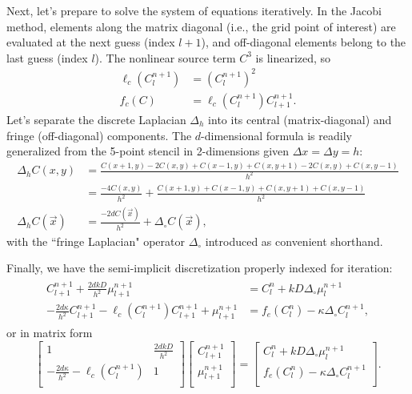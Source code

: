 	Next, let's prepare to solve the system of equations iteratively.
	In the Jacobi method, elements along the matrix diagonal (i.e., the grid point of interest) are evaluated at
	the next guess (index $l+1$), and off-diagonal elements belong to the last guess (index $l$).
	The nonlinear source term $C^3$ is linearized, so
	\begin{align*}
		\ell_c(C_l^{n+1}) &= \left(C_l^{n+1}\right)^2\\
		f_c(C) &= \ell_c(C_l^{n+1})C^{n+1}_{l+1}.
	\end{align*}
	Let's separate the discrete Laplacian $\Delta_h$ into its central (matrix-diagonal) and fringe (off-diagonal) components. The $d$-dimensional
	formula is readily generalized from the 5-point stencil in 2-dimensions given $\Delta x=\Delta y=h$:
	\begin{align*}
		\Delta_hC(x,y)	&= \frac{C(x+1,y)-2C(x,y)+C(x-1,y)+C(x,y+1)-2C(x,y)+C(x,y-1)}{h^2}\\
						&= \frac{-4C(x,y)}{h^2}+\frac{C(x+1,y)+C(x-1,y)+C(x,y+1)+C(x,y-1)}{h^2}\\
		\Delta_hC(\vec{x})	&= \frac{-2dC(\vec{x})}{h^2} + \Delta_\circ C(\vec{x}),
	\end{align*}
	with the ``fringe Laplacian" operator $\Delta_\circ$ introduced as convenient shorthand.

	Finally, we have the semi-implicit discretization properly indexed for iteration:
	\begin{align}
	\begin{split}
		C_{l+1}^{n+1} + \frac{2dkD}{h^2}\mu_{l+1}^{n+1} &= C_l^n + kD\Delta_\circ\mu_l^{n+1}\\
		-\frac{2d\kappa}{h^2}C_{l+1}^{n+1} - \ell_c(C_l^{n+1})C_{l+1}^{n+1} + \mu_{l+1}^{n+1} &= f_e(C_l^n) - \kappa\Delta_\circ C_l^{n+1},
	\end{split}
	\label{eqn:jacobieom}
	\end{align}
	or in matrix form
	\[
		\begin{bmatrix}
			1	&	\frac{2dkD}{h^2}\\[0.5em]
			-\frac{2d\kappa}{h^2} - \ell_c\left(C_l^{n+1}\right) & 1\\
		\end{bmatrix}
		\begin{bmatrix}
			C_{l+1}^{n+1} \\[0.5em]
			\mu_{l+1}^{n+1}\\
		\end{bmatrix}
		=
		\begin{bmatrix}
			C_l^n + kD\Delta_\circ\mu_l^{n+1}\\[0.5em]
			f_e(C_l^n) - \kappa\Delta_\circ C_l^{n+1}\\
		\end{bmatrix}.
	\]

